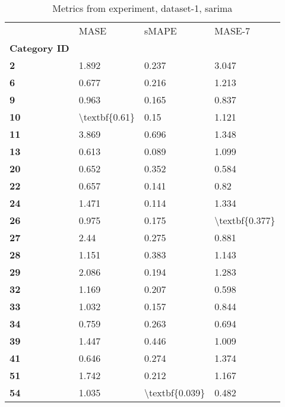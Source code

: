 \begin{table}[h]
\centering
\caption{Metrics from experiment, dataset-1, sarima}
\label{table:sarima-dataset-1}
\begin{tabular}{llll}
\toprule
{} &           MASE &           sMAPE &          MASE-7 \\
\textbf{Category ID} &                &                 &                 \\
\midrule
\textbf{2          } &          1.892 &           0.237 &           3.047 \\
\textbf{6          } &          0.677 &           0.216 &           1.213 \\
\textbf{9          } &          0.963 &           0.165 &           0.837 \\
\textbf{10         } &  \textbackslash textbf\{0.61\} &            0.15 &           1.121 \\
\textbf{11         } &          3.869 &           0.696 &           1.348 \\
\textbf{13         } &          0.613 &           0.089 &           1.099 \\
\textbf{20         } &          0.652 &           0.352 &           0.584 \\
\textbf{22         } &          0.657 &           0.141 &            0.82 \\
\textbf{24         } &          1.471 &           0.114 &           1.334 \\
\textbf{26         } &          0.975 &           0.175 &  \textbackslash textbf\{0.377\} \\
\textbf{27         } &           2.44 &           0.275 &           0.881 \\
\textbf{28         } &          1.151 &           0.383 &           1.143 \\
\textbf{29         } &          2.086 &           0.194 &           1.283 \\
\textbf{32         } &          1.169 &           0.207 &           0.598 \\
\textbf{33         } &          1.032 &           0.157 &           0.844 \\
\textbf{34         } &          0.759 &           0.263 &           0.694 \\
\textbf{39         } &          1.447 &           0.446 &           1.009 \\
\textbf{41         } &          0.646 &           0.274 &           1.374 \\
\textbf{51         } &          1.742 &           0.212 &           1.167 \\
\textbf{54         } &          1.035 &  \textbackslash textbf\{0.039\} &           0.482 \\
\bottomrule
\end{tabular}
\end{table}
